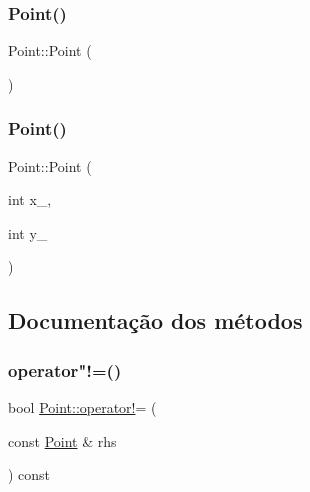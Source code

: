 \subsubsection{\texorpdfstring{Point()}{Point()}\hspace{0.1cm}{\footnotesize\ttfamily [1/2]}}
{\footnotesize\ttfamily Point\+::\+Point (\begin{DoxyParamCaption}{ }\end{DoxyParamCaption})\hspace{0.3cm}{\ttfamily [default]}}

\mbox{\label{structPoint_a7733108bf07d2ef72e1b55aed68eb2fc}} 
\subsubsection{\texorpdfstring{Point()}{Point()}\hspace{0.1cm}{\footnotesize\ttfamily [2/2]}}
{\footnotesize\ttfamily Point\+::\+Point (\begin{DoxyParamCaption}\item[{int}]{x\+\_\+,  }\item[{int}]{y\+\_\+ }\end{DoxyParamCaption})}



\subsection{Documentação dos métodos}
\mbox{\label{structPoint_a412beea7de93a9e22b8ace5fb4170111}} 
\subsubsection{\texorpdfstring{operator"!=()}{operator!=()}}
{\footnotesize\ttfamily bool \hyperlink{game__classes_8hpp_a5dea3f07ccd43cf7042c728d769e92fc}{Point\+::operator!}= (\begin{DoxyParamCaption}\item[{const \hyperlink{structPoint}{Point} \&}]{rhs }\end{DoxyParamCaption}) const}

\mbox{\label{structPoint_a0367b61d5e647f2cfa5f1c4897be31ec}} 
